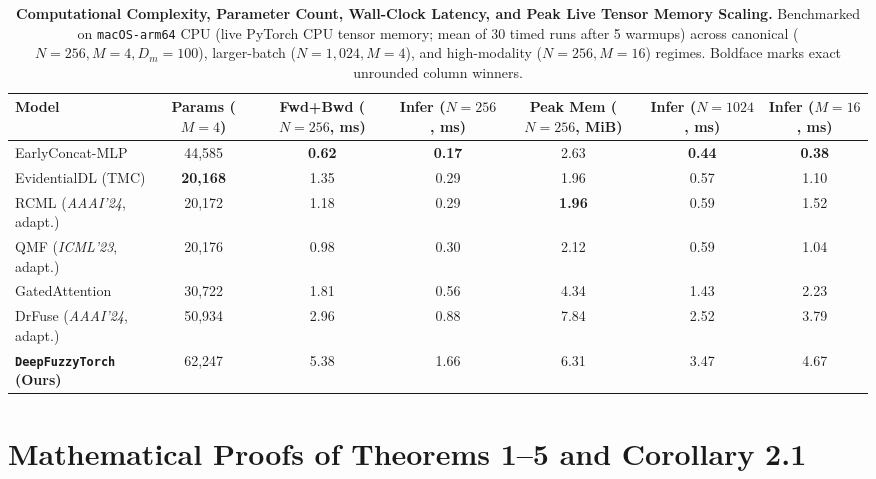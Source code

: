 \documentclass[10pt,twocolumn]{article}
\begin{document}
\begin{table}[t]
\centering
\caption{\textbf{Computational Complexity, Parameter Count, Wall-Clock Latency, and Peak Live
Tensor Memory Scaling.} Benchmarked on \texttt{macOS-arm64} CPU (live PyTorch CPU tensor
memory; mean of 30 timed runs after 5 warmups) across canonical ($N=256, M=4, D_m=100$),
larger-batch ($N=1,024, M=4$), and high-modality ($N=256, M=16$) regimes. Boldface marks
exact unrounded column winners.}
\label{tab:runtime}
\footnotesize
\setlength{\tabcolsep}{5.0pt}
\begin{tabular}{@{}lcccccc@{}}
\toprule
\textbf{Model} & \shortstack{\textbf{Params}\\\textbf{($M=4$)}} &
\shortstack{\textbf{Fwd+Bwd}\\\textbf{($N=256$, ms)}} &
\shortstack{\textbf{Infer}\\\textbf{($N=256$, ms)}} & \shortstack{\textbf{Peak
Mem}\\\textbf{($N=256$, MiB)}} & \shortstack{\textbf{Infer}\\\textbf{($N=1024$, ms)}} &
\shortstack{\textbf{Infer}\\\textbf{($M=16$, ms)}} \\
\midrule
EarlyConcat-MLP \cite{baltrusaitis2018multimodal} & 44,585 & \textbf{0.62} & \textbf{0.17} &
2.63 & \textbf{0.44} & \textbf{0.38} \\
EvidentialDL (TMC) \cite{han2022trusted} & \textbf{20,168} & 1.35 & 0.29 & 1.96 & 0.57 & 1.10
\\
RCML (\textit{AAAI'24}, adapt.) \cite{xu2024reliable} & 20,172 & 1.18 & 0.29 & \textbf{1.96} &
0.59 & 1.52 \\
QMF (\textit{ICML'23}, adapt.) \cite{zhang2023provable} & 20,176 & 0.98 & 0.30 & 2.12 & 0.59 &
1.04 \\
GatedAttention \cite{arevalo2017gated} & 30,722 & 1.81 & 0.56 & 4.34 & 1.43 & 2.23 \\
DrFuse (\textit{AAAI'24}, adapt.) \cite{yao2024drfuse} & 50,934 & 2.96 & 0.88 & 7.84 & 2.52 &
3.79 \\
\midrule
\textbf{\texttt{DeepFuzzyTorch} (Ours)} & 62,247 & 5.38 & 1.66 & 6.31 & 3.47 & 4.67 \\
\bottomrule
\end{tabular}
\end{table}
\FloatBarrier

\section{Mathematical Proofs of Theorems 1--5 and Corollary 2.1}
\label{app:proofs}
\end{document}
